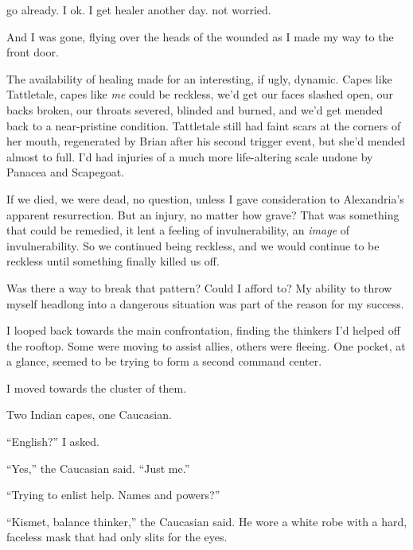 go already.  I ok.  I get healer another day.  not worried.



And I was gone, flying over the heads of the wounded as I made my way to the front door.



The availability of healing made for an interesting, if ugly, dynamic.  Capes like Tattletale, capes like \emph{me} could be reckless, we'd get our faces slashed open, our backs broken, our throats severed, blinded and burned, and we'd get mended back to a near-pristine condition.  Tattletale still had faint scars at the corners of her mouth, regenerated by Brian after his second trigger event, but she'd mended almost to full.  I'd had injuries of a much more life-altering scale undone by Panacea and Scapegoat.



If we died, we were dead, no question, unless I gave consideration to Alexandria's apparent resurrection.  But an injury, no matter how grave?  That was something that could be remedied, it lent a feeling of invulnerability, an \emph{image} of invulnerability.  So we continued being reckless, and we would continue to be reckless until something finally killed us off.



Was there a way to break that pattern?  Could I afford to?  My ability to throw myself headlong into a dangerous situation was part of the reason for my success.



I looped back towards the main confrontation, finding the thinkers I'd helped off the rooftop.  Some were moving to assist allies, others were fleeing.  One pocket, at a glance, seemed to be trying to form a second command center.



I moved towards the cluster of them.



Two Indian capes, one Caucasian.



``English?'' I asked.



``Yes,'' the Caucasian said.  ``Just me.''



``Trying to enlist help.  Names and powers?''



``Kismet, balance thinker,'' the Caucasian said.  He wore a white robe with a hard, faceless mask that had only slits for the eyes.



